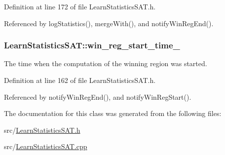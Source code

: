 Definition at line 172 of file Learn\-Statistics\-S\-A\-T.\-h.



Referenced by log\-Statistics(), merge\-With(), and notify\-Win\-Reg\-End().

\hypertarget{classLearnStatisticsSAT_a04c8091b3380c8d756d40aabeefbfbe1}{
\subsubsection[{win\-\_\-reg\-\_\-start\-\_\-time\-\_\-}]{ Learn\-Statistics\-S\-A\-T\-::win\-\_\-reg\-\_\-start\-\_\-time\-\_\-\hspace{0.3cm}{\ttfamily [protected]}}}\label{classLearnStatisticsSAT_a04c8091b3380c8d756d40aabeefbfbe1}


The time when the computation of the winning region was started. 



Definition at line 162 of file Learn\-Statistics\-S\-A\-T.\-h.



Referenced by notify\-Win\-Reg\-End(), and notify\-Win\-Reg\-Start().



The documentation for this class was generated from the following files\-:\begin{DoxyCompactItemize}
\item 
src/\hyperlink{LearnStatisticsSAT_8h}{Learn\-Statistics\-S\-A\-T.\-h}\item 
src/\hyperlink{LearnStatisticsSAT_8cpp}{Learn\-Statistics\-S\-A\-T.\-cpp}\end{DoxyCompactItemize}
